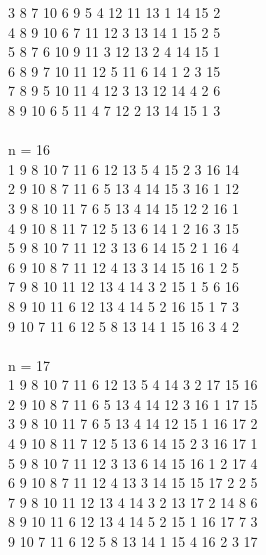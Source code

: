 {3 8 7 10 6 9 5 4 12 11 13 1 14 15 2\\
4 8 9 10 6 7 11 12 3 13 14 1 15 2 5\\
5 8 7 6 10 9 11 3 12 13 2 4 14 15 1\\
6 8 9 7 10 11 12 5 11 6 14 1 2 3 15 \\
7 8 9 5 10 11 4 12 3 13 12 14 4 2 6\\
8 9 10 6 5 11 4 7 12 2 13 14 15 1 3\\
\\
n = 16\\
1 9 8 10 7 11 6 12 13 5 4 15 2 3 16 14\\
2 9 10 8 7 11 6 5 13 4 14 15 3 16 1 12\\
3 9 8 10 11 7 6 5 13 4 14 15 12 2 16 1\\
4 9 10 8 11 7 12 5 13 6 14 1 2 16 3 15\\
5 9 8 10 7 11 12 3 13 6 14 15 2 1 16 4\\
6 9 10 8 7 11 12 4 13 3 14 15 16 1 2 5\\
7 9 8 10 11 12 13 4 14 3 2 15 1 5 6 16 \\
8 9 10 11 6 12 13 4 14 5 2 16 15 1 7 3\\
9 10 7 11 6 12 5 8 13 14 1 15 16 3 4 2\\
\\
n = 17\\
1 9 8 10 7 11 6 12 13 5 4 14 3 2 17 15 16\\
2 9 10 8 7 11 6 5 13 4 14 12 3 16 1 17 15\\
3 9 8 10 11 7 6 5 13 4 14 12 15 1 16 17 2\\
4 9 10 8 11 7 12 5 13 6 14 15 2 3 16 17 1\\
5 9 8 10 7 11 12 3 13 6 14 15 16 1 2 17 4\\
6 9 10 8 7 11 12 4 13 3 14 15 15 17 2 2 5\\
7 9 8 10 11 12 13 4 14 3 2 13 17 2 14 8 6\\
8 9 10 11 6 12 13 4 14 5 2 15 1 16 17 7 3\\
9 10 7 11 6 12 5 8 13 14 1 15 4 16 2 3 17\\
}
